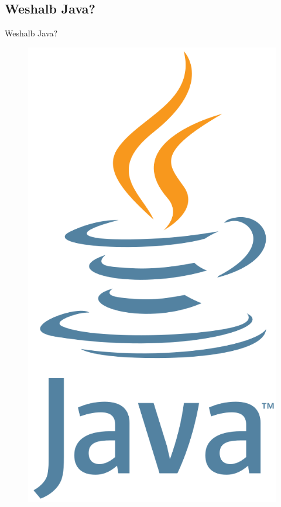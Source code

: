 \documentclass[aspectratio=169]{beamer}
\begin{document}
\subsection{Weshalb Java?}
\begin{frame}[plain]{Weshalb Java?}
\begin{varwidth}{.3\textwidth}
        \begin{figure}
            \centering
            \includegraphics[height=.8\textheight]{media/java-logo.png}

\end{figure}
\end{varwidth}
\end{frame}
\end{document}
